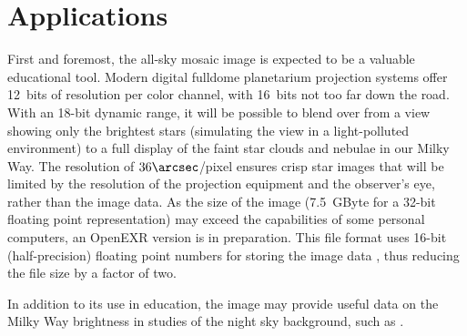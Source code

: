 \documentclass[preprint]{aastex}
\begin{document}
\section{Applications}
First and foremost, the all-sky mosaic image is expected to be a valuable educational tool. Modern digital fulldome planetarium projection systems offer 12~bits of resolution per color channel, with 16~bits not too far down the road. With an 18-bit dynamic range, it will be possible to blend over from a view showing only the brightest stars (simulating the view in a light-polluted environment) to a full display of the faint star clouds and nebulae in our Milky Way. 
The resolution of $36\arcsec$/pixel ensures crisp star images that will be limited by the resolution of the projection equipment and the observer's eye, rather than the image data. As the size of the image (7.5~GByte for a 32-bit floating point representation) may exceed the capabilities of some personal computers, an OpenEXR version is in preparation. This file format uses 16-bit (half-precision) floating point numbers for storing the image data \citep{OpenEXR}, thus reducing the file size by a factor of two.

In addition to its use in education, the image may provide useful data on the Milky Way brightness in studies of the night sky background, such as \citet{Dur2007}.










\end{document}
